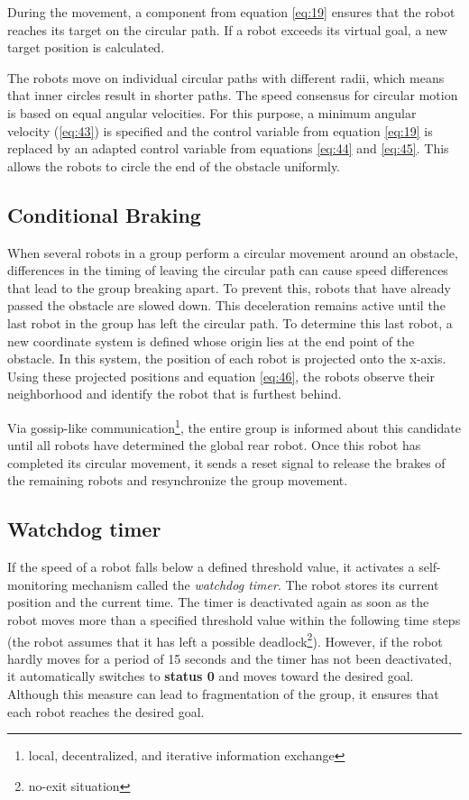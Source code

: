 \documentclass[conference]{IEEEtran}
\begin{document}
During the movement, a component from equation \eqref{eq:19} ensures that the robot 
reaches its target on the circular path. If a robot exceeds its 
virtual goal, a new target position is calculated.

The robots move on individual circular paths with 
different radii, which means that inner circles result in shorter paths. 
The speed consensus for circular motion is based on equal 
angular velocities. For this purpose, a minimum angular velocity (\eqref{eq:43}) 
is specified and the control variable from equation \eqref{eq:19} is replaced by an 
adapted control variable 
from equations \eqref{eq:44} and \eqref{eq:45}. 
This allows the robots to circle the end of the obstacle uniformly.

\subsection*{Conditional Braking}
When several robots in a group perform a circular movement around an obstacle, differences in the timing of leaving the circular path can cause speed differences that lead to the group breaking apart.
To prevent this, robots that have already passed the obstacle are slowed down.
This deceleration remains active until the last robot in the group has left the circular path.
To determine this last robot, a new coordinate system is defined whose origin lies at the end point of the obstacle. In this system, the 
position of each robot is projected onto the x-axis. Using these projected 
positions and equation \eqref{eq:46}, the robots observe their neighborhood and 
identify the robot that is furthest behind.

Via gossip-like 
communication\footnote{local, decentralized, and iterative information exchange}, the entire group is informed about this candidate until 
all robots have determined the global rear robot. Once 
this robot has completed its circular movement, it sends a reset signal to 
release the brakes of the remaining robots and resynchronize the group movement.

\subsection*{Watchdog timer}
If the speed of a robot falls below a defined threshold value, 
it activates a self-monitoring mechanism called the \textit{watchdog timer}. 
The robot stores its current position and the current time. 
The timer is deactivated again as soon as the robot moves more than a specified threshold 
value within the following time steps 
(the robot assumes that it has left a possible deadlock\footnote{no-exit situation}). 
However, if the robot hardly moves for a period of 15 seconds 
and the timer has not been deactivated, it automatically switches to \textbf{status 0} 
and moves toward the desired goal. Although this measure can lead to 
fragmentation of the group, it ensures that each robot 
reaches the desired goal.
\end{document}
